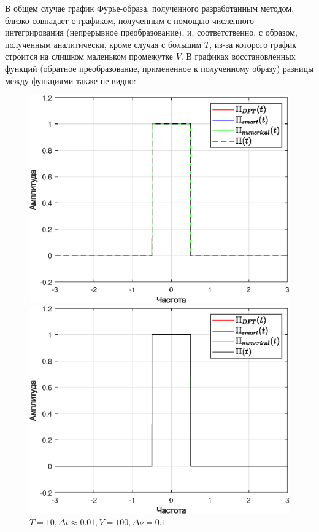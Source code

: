 \documentclass[a4paper]{article}
\begin{document}
В общем случае график Фурье-образа, полученного разработанным методом, близко совпадает с графиком, полученным с помощью численного интегрирования (непрерывное преобразование), и, соответственно, с образом, полученным аналитически, кроме случая с большим $T$, из-за которого график строится на слишком маленьком промежутке $V$. В графиках восстановленных функций (обратное преобразование, примененное к полученному образу) разницы между функциями также не видно:

\begin{figure}[H]
    \begin{minipage}{0.5\textwidth}
        \centering \includegraphics[width=\textwidth]{graphs/3/T_5_dt_0.005005_V_200_dv_0.2/func_combined_all.eps}
        \caption{$T = 5, \Delta t \approx 0.005, V = 200, \Delta \nu = 0.2$} %
    \end{minipage}\hfill
    \begin{minipage}{0.5\textwidth}
        \centering \includegraphics[width=\textwidth]{graphs/3/T_10_dt_0.01001_V_100_dv_0.1/func_combined_all.eps}
        \caption{$T = 10, \Delta t \approx 0.01, V = 100, \Delta \nu = 0.1$}
    \end{minipage}\hfill
\end{figure}\noindent\
\end{document}
